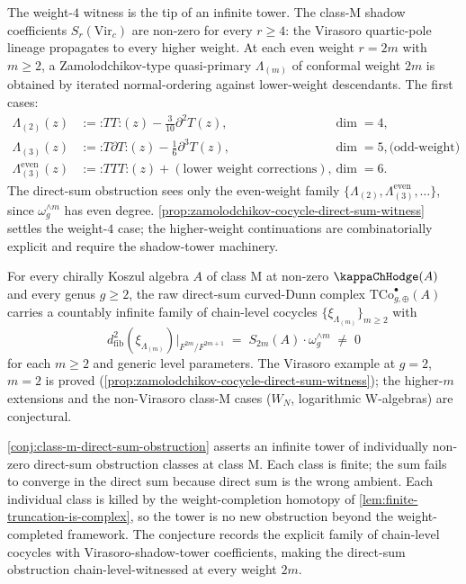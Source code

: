 The weight-\(4\) witness is the tip of an infinite tower. The
class-\(\mathrm{M}\) shadow coefficients
\(S_{r}(\mathrm{Vir}_{c})\) are non-zero for every \(r \ge 4\):
the Virasoro quartic-pole lineage propagates to every higher
weight. At each even weight \(r = 2m\) with \(m \ge 2\), a
Zamolodchikov-type quasi-primary \(\Lambda_{(m)}\) of conformal
weight \(2m\) is obtained by iterated normal-ordering against
lower-weight descendants. The first cases:
\begin{align*}
 \Lambda_{(2)}(z) &:= {\mathord:} T T {\mathord:}(z) - \frac{3}{10}\partial^{2} T(z),
 &\dim = 4,\\
 \Lambda_{(3)}(z) &:= {\mathord:} T \partial T {\mathord:}(z) - \frac{1}{6}\partial^{3} T(z),
 &\dim = 5,
 \text{(odd-weight)}\\
 \Lambda_{(3)}^{\mathrm{even}}(z) &:= {\mathord:} T T T {\mathord:}(z) + (\text{lower weight corrections}),
 &\dim = 6.
\end{align*}
The direct-sum obstruction sees only the even-weight family
\(\{\Lambda_{(2)}, \Lambda_{(3)}^{\mathrm{even}}, \ldots\}\),
since \(\omega_{g}^{\wedge m}\) has even degree.
\autoref{prop:zamolodchikov-cocycle-direct-sum-witness} settles
the weight-\(4\) case; the higher-weight continuations are
combinatorially explicit and require the shadow-tower machinery.

\begin{conjecture}
\label{conj:class-m-direct-sum-obstruction}
\ClaimStatusConjectured
For every chirally Koszul algebra \(A\) of class
\(\mathrm{M}\) at non-zero \(\kappaChHodge(A)\) and every genus
\(g \ge 2\), the raw direct-sum curved-Dunn complex
\(\mathrm{TCo}^{\bullet}_{g,\oplus}(A)\) carries a countably
infinite family of chain-level cocycles
\(\{\xi_{\Lambda_{(m)}}\}_{m \ge 2}\) with
\[
 d^{2}_{\mathrm{fib}}(\xi_{\Lambda_{(m)}})
 \Big|_{F^{2m}/F^{2m+1}}
 \;=\;
 S_{2m}(A) \cdot \omega_{g}^{\wedge m}
 \;\ne\; 0
\]
for each \(m \ge 2\) and generic level parameters.
The Virasoro example at \(g = 2\), \(m = 2\) is proved
(\autoref{prop:zamolodchikov-cocycle-direct-sum-witness}); the
higher-\(m\) extensions and the non-Virasoro class-\(\mathrm{M}\)
cases (\(W_{N}\), logarithmic W-algebras) are conjectural.
\end{conjecture}

\begin{remark}
\label{rem:conjecture-scope}
\autoref{conj:class-m-direct-sum-obstruction} asserts an
infinite tower of individually non-zero direct-sum obstruction
classes at class \(\mathrm{M}\). Each class is finite; the sum
fails to converge in the direct sum because direct sum is the
wrong ambient. Each individual class is killed by the
weight-completion homotopy of
\autoref{lem:finite-truncation-is-complex}, so the tower is no
new obstruction beyond the weight-completed framework. The
conjecture records the explicit family of chain-level cocycles
with Virasoro-shadow-tower coefficients, making the direct-sum
obstruction chain-level-witnessed at every weight \(2m\).
\end{remark}

